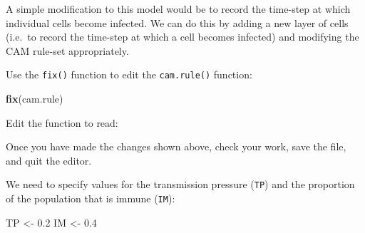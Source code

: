 \documentclass[12pt,a4paper]{book}
\newenvironment{Shaded}{\begin{snugshade}}{\end{snugshade}}
\newcommand{\KeywordTok}[1]{\textcolor[rgb]{0.13,0.29,0.53}{\textbf{#1}}}
\newcommand{\DecValTok}[1]{\textcolor[rgb]{0.00,0.00,0.81}{#1}}
\newcommand{\FloatTok}[1]{\textcolor[rgb]{0.00,0.00,0.81}{#1}}
\newcommand{\StringTok}[1]{\textcolor[rgb]{0.31,0.60,0.02}{#1}}
\newcommand{\ControlFlowTok}[1]{\textcolor[rgb]{0.13,0.29,0.53}{\textbf{#1}}}
\newcommand{\OperatorTok}[1]{\textcolor[rgb]{0.81,0.36,0.00}{\textbf{#1}}}
\newcommand{\NormalTok}[1]{#1}
\theoremstyle{definition}
\theoremstyle{definition}
\theoremstyle{definition}
\theoremstyle{remark}
\begin{document}
A simple modification to this model would be to record the time-step at
which individual cells become infected. We can do this by adding a new
layer of cells (i.e.~to record the time-step at which a cell becomes
infected) and modifying the CAM rule-set appropriately.

Use the \texttt{fix()} function to edit the \texttt{cam.rule()}
function:

\begin{Shaded}
\begin{Highlighting}[]
\KeywordTok{fix}\NormalTok{(cam.rule)}
\end{Highlighting}
\end{Shaded}

Edit the function to read:

\begin{Shaded}
\end{Shaded}

Once you have made the changes shown above, check your work, save the
file, and quit the editor.

We need to specify values for the transmission pressure (\texttt{TP})
and the proportion of the population that is immune (\texttt{IM}):

\begin{Shaded}
\begin{Highlighting}[]
\NormalTok{TP <-}\StringTok{ }\FloatTok{0.2}
\NormalTok{IM <-}\StringTok{ }\FloatTok{0.4}
\end{Highlighting}
\end{Shaded}
\end{document}
